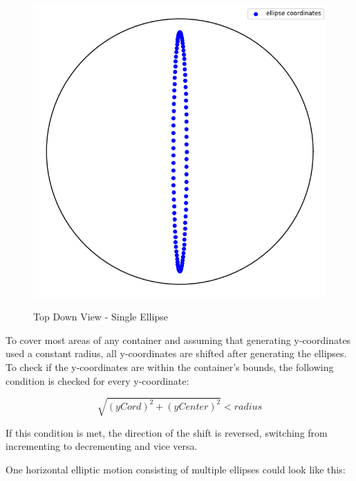\begin{figure}[H]
    \includegraphics[scale=0.35]{Graphics/motions/ellipse.png}
    \centering
    \label{fig:foldingMotion1}
    \caption{Top Down View - Single Ellipse}
\end{figure}


To cover most areas of any container and assuming that generating y-coordinates used a constant radius, all y-coordinates are shifted after generating the ellipses. 
To check if the y-coordinates are within the container's bounds, the following condition is checked for every y-coordinate:

\[\sqrt{(yCord)^2 + (yCenter)^2} < radius\]

If this condition is met, the direction of the shift is reversed, switching from incrementing to decrementing and vice versa.

One horizontal elliptic motion consisting of multiple ellipses could look like this:

